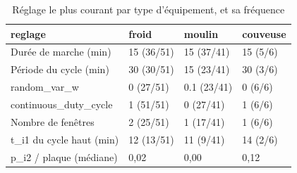 \begin{table}[htbp]
\caption{Réglage le plus courant par type d'équipement, et sa fréquence}
\label{tab:transfert_reglages}
\begin{tabular}{llll}
\toprule
reglage & froid & moulin & couveuse \\
\midrule
Durée de marche (min) & 15 (36/51) & 15 (37/41) & 15 (5/6) \\
Période du cycle (min) & 30 (30/51) & 15 (23/41) & 30 (3/6) \\
random\_var\_w & 0 (27/51) & 0.1 (23/41) & 0 (6/6) \\
continuous\_duty\_cycle & 1 (51/51) & 0 (27/41) & 1 (6/6) \\
Nombre de fenêtres & 2 (25/51) & 1 (17/41) & 1 (6/6) \\
t\_i1 du cycle haut (min) & 12 (13/51) & 11 (9/41) & 14 (2/6) \\
p\_i2 / plaque (médiane) & 0,02 & 0,00 & 0,12 \\
\bottomrule
\end{tabular}
\end{table}
